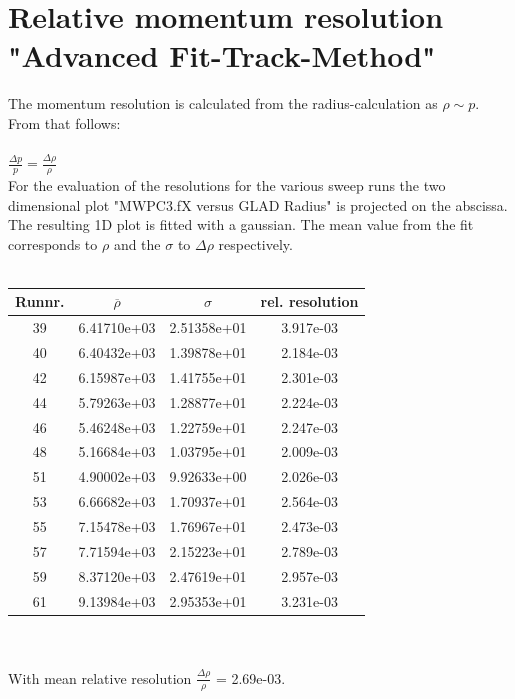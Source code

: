 \documentclass[12pt, letterpaper]{article}
\begin{document}
\section{Relative momentum resolution "Advanced Fit-Track-Method"}

The momentum resolution is calculated from the radius-calculation as $\rho \sim p$. From that follows:\\
\\
$\frac{\Delta p}{p} = \frac{\Delta\rho}{\rho}$
\\
For the evaluation of the resolutions for the various sweep runs the two dimensional plot "MWPC3.fX versus GLAD Radius" is projected on the abscissa. The resulting 1D plot is fitted with a gaussian. The mean value from the fit corresponds to $\rho$ and the $\sigma$ to $\Delta\rho$ respectively.\\
\\
\begin{tabular}{|c|c|c|c|}
\hline
Runnr. & $\overline{\rho}$ & $\sigma$ & rel. resolution \\
\hline
39     &         6.41710e+03    &     2.51358e+01    &     3.917e-03\\
40     &         6.40432e+03    &     1.39878e+01    &     2.184e-03\\
42     &         6.15987e+03    &     1.41755e+01    &     2.301e-03\\
44     &         5.79263e+03    &     1.28877e+01    &     2.224e-03\\
46     &         5.46248e+03    &     1.22759e+01    &     2.247e-03\\
48     &         5.16684e+03    &     1.03795e+01    &     2.009e-03\\
51     &         4.90002e+03    &     9.92633e+00    &     2.026e-03\\
53     &         6.66682e+03    &     1.70937e+01    &     2.564e-03\\
55     &         7.15478e+03    &     1.76967e+01    &     2.473e-03\\
57     &         7.71594e+03    &     2.15223e+01    &     2.789e-03\\
59     &         8.37120e+03    &     2.47619e+01    &     2.957e-03\\
61     &         9.13984e+03    &     2.95353e+01    &     3.231e-03\\
\hline

\end{tabular}
\\
\\
\newline
With mean relative resolution $\frac{\Delta\rho}{\rho}$ = 2.69e-03.
\end{document}

